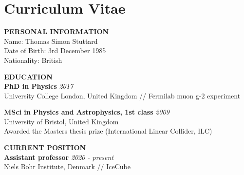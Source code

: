 \documentclass[a4paper,11pt]{article}
\renewcommand{\smallskip} {\vspace{0.1in}}
\begin{document}



\newpage

\section{Curriculum Vitae}


\vspace{0.2cm}
\textbf{PERSONAL INFORMATION ~~\hrulefill}\smallskip\\
Name: Thomas Simon Stuttard \\
Date of Birth: 3rd December 1985\\
Nationality: British

%
\vspace{0.2cm}
\textbf{EDUCATION ~~\hrulefill}\smallskip\\
%
{\bf PhD in Physics} \hfill {\em 2017} \\ 
University College London, United Kingdom // Fermilab muon g-2 experiment

{\bf MSci in Physics and Astrophysics, 1st class} \hfill {\em 2009} \\ 
University of Bristol, United Kingdom \\
Awarded the Masters thesis prize (International Linear Collider, ILC)

%
%
\vspace{0.2cm}
\textbf{CURRENT POSITION ~~\hrulefill}\smallskip\\
%
{\bf Assistant professor} \hfill {\em 2020 - present} \\ 
Niels Bohr Institute, Denmark // IceCube
\end{document}
